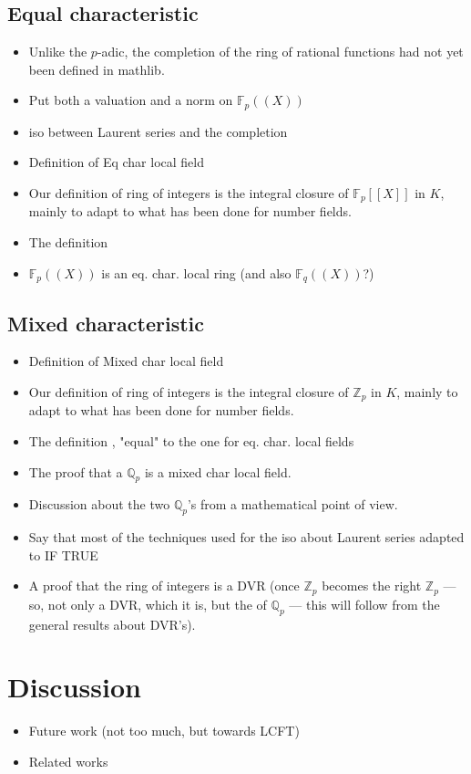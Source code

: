 \documentclass[sigplan,10pt,anonymous,review]{acmart}\settopmatter{printfolios=true,printccs=false,printacmref=false}
\newcommand{\fil}[1]{{\color{red} #1}}
\newcommand*{\ZZ}{\mathbb{Z}}
\newcommand*{\QQ}{\mathbb{Q}}
\newcommand*{\FF}[1][p]{\mathbb{F}_{#1}}
\newcommand*{\laurentseries}[1][{\FF}]{#1(\!(X)\!)}
\newcommand*{\powerseries}[1][{\FF}]{#1[\![X]\!]}
\begin{document}
\subsection{Equal characteristic}
\begin{itemize}
	\item Unlike the $p$-adic, the completion of the ring of rational functions had not yet been defined in mathlib.
	\item Put both a valuation and a norm on $\laurentseries$
	\item iso between Laurent series and the completion
	\item Definition of Eq char local field
	\item Our definition of ring of integers is the integral closure of $\powerseries$ in $K$, mainly to adapt to what has been done for number fields.
	\item The definition 
	\item $\laurentseries$ is an eq. char. local ring \fil{(and also $\laurentseries[{\FF[q]}]$?)}
	
\end{itemize}
\subsection{Mixed characteristic}
\begin{itemize}
	\item Definition of Mixed char local field
	\item Our definition of ring of integers is the integral closure of $\ZZ_p$ in $K$, mainly to adapt to what has been done for number fields.
	\item The definition , "equal" to the one for eq. char. local fields
	\item The proof that a $\QQ_p$ is a mixed char local field.
	\item Discussion about the two $\QQ_p$'s from a mathematical point of view.
	\item Say that most of the techniques used for the iso about Laurent series adapted to  IF TRUE
	\item A proof that the ring of integers is a DVR (once $\ZZ_p$ becomes the right $\ZZ_p$ --- so, not only a DVR, which it is, but the  of $\QQ_p$ --- this will follow from the general results about DVR's).
\end{itemize}


\section{Discussion}
\begin{itemize}
	\item Future work (not too much, but towards LCFT)
	\item Related works
\end{itemize}
\end{document}
